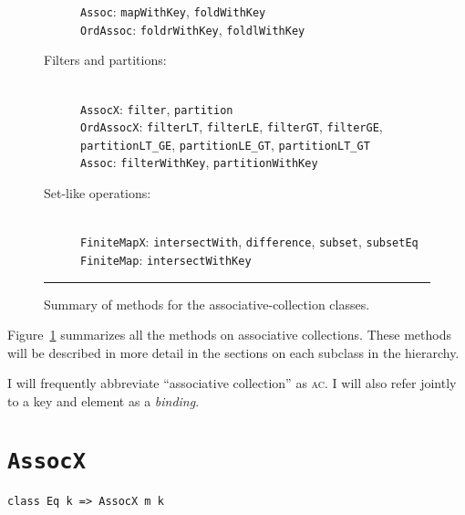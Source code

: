 \documentclass{report}
\newcommand{\cd}{\texttt}
\newcommand{\Figure}[1]{Figure~\ref{#1}}
\newcommand{\nl}{\hspace*{0pt}\\}
\newcommand{\AC}{\textsc{ac}\xspace}
\begin{document}
\begin{figure}
\begin{description}
\cd{Assoc}: \cd{mapWithKey}, \cd{foldWithKey} \\
\cd{OrdAssoc}: \cd{foldrWithKey}, \cd{foldlWithKey}
\item[Filters and partitions:] \nl
\cd{AssocX}: \cd{filter}, \cd{partition} \\
\cd{OrdAssocX}:
  \cd{filterLT}, \cd{filterLE}, \cd{filterGT}, \cd{filterGE}, \\
  \hspace*{20pt}
  \cd{partitionLT\_GE}, \cd{partitionLE\_GT}, \cd{partitionLT\_GT} \\
\cd{Assoc}: \cd{filterWithKey}, \cd{partitionWithKey}
\item[Set-like operations:] \nl
\cd{FiniteMapX}: \cd{intersectWith}, \cd{difference}, \cd{subset}, \cd{subsetEq} \\
\cd{FiniteMap}: \cd{intersectWithKey}
\end{description}
\hrule
\caption{Summary of methods for the associative-collection classes.}
\label{assoc-methods}
\end{figure}

\Figure{assoc-methods} summarizes all the methods on associative collections.
These methods will be described in more detail in the sections on each subclass
in the hierarchy.

I will frequently abbreviate ``associative collection'' as \AC.  I
will also refer jointly to a key and element as a \emph{binding}.

\section{\cd{AssocX}}
\begin{verbatim}
class Eq k => AssocX m k
\end{verbatim}
\end{document}
